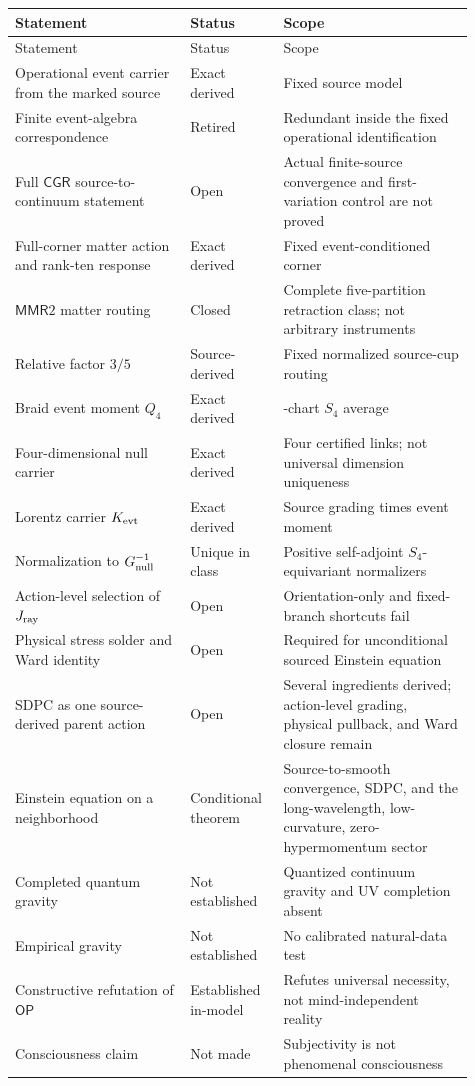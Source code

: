 \documentclass[11pt]{article}
\theoremstyle{definition}
\theoremstyle{remark}
\newcommand{\OPT}{\mathsf{OP}}
\newcommand{\MMR}{\mathsf{MMR}}
\newcommand{\CGR}{\mathsf{CGR}}
\begin{document}
\begin{longtable}{>{\raggedright\arraybackslash}p{0.35\linewidth} >{\raggedright\arraybackslash}p{0.18\linewidth} >{\raggedright\arraybackslash}p{0.38\linewidth}}
\toprule
Statement & Status & Scope \\
\midrule
\endfirsthead
\toprule
Statement & Status & Scope \\
\midrule
\endhead
Operational event carrier from the marked source & Exact derived & Fixed source model \\
Finite event-algebra correspondence & Retired & Redundant inside the fixed operational identification \\
Full $\CGR$ source-to-continuum statement & Open & Actual finite-source convergence and first-variation control are not proved \\
Full-corner matter action and rank-ten response & Exact derived & Fixed event-conditioned corner \\
$\MMR2$ matter routing & Closed & Complete five-partition retraction class; not arbitrary instruments \\
Relative factor $3/5$ & Source-derived & Fixed normalized source-cup routing \\
Braid event moment $Q_4$ & Exact derived & 24-chart $S_4$ average \\
Four-dimensional null carrier & Exact derived & Four certified links; not universal dimension uniqueness \\
Lorentz carrier $K_{\rm evt}$ & Exact derived & Source grading times event moment \\
Normalization to $G_{\rm null}^{-1}$ & Unique in class & Positive self-adjoint $S_4$-equivariant normalizers \\
Action-level selection of $J_{\rm ray}$ & Open & Orientation-only and fixed-branch shortcuts fail \\
Physical stress solder and Ward identity & Open & Required for unconditional sourced Einstein equation \\
SDPC as one source-derived parent action & Open & Several ingredients derived; action-level grading, physical pullback, and Ward closure remain \\
Einstein equation on a neighborhood & Conditional theorem & Source-to-smooth convergence, SDPC, and the long-wavelength, low-curvature, zero-hypermomentum sector \\
Completed quantum gravity & Not established & Quantized continuum gravity and UV completion absent \\
Empirical gravity & Not established & No calibrated natural-data test \\
Constructive refutation of $\OPT$ & Established in-model & Refutes universal necessity, not mind-independent reality \\
Consciousness claim & Not made & Subjectivity is not phenomenal consciousness \\
\bottomrule
\end{longtable}
\end{document}
